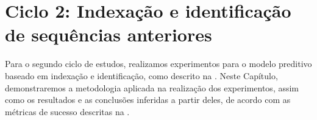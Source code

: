\chapter{Ciclo 2: Indexação e identificação de sequências anteriores}
\label{chap:dtw}

Para o segundo ciclo de estudos, realizamos experimentos para o modelo preditivo baseado em indexação e identificação, como descrito na . Neste Capítulo, demonstraremos a metodologia aplicada na realização dos experimentos, assim como os resultados e as conclusões inferidas a partir deles, de acordo com as métricas de sucesso descritas na .


